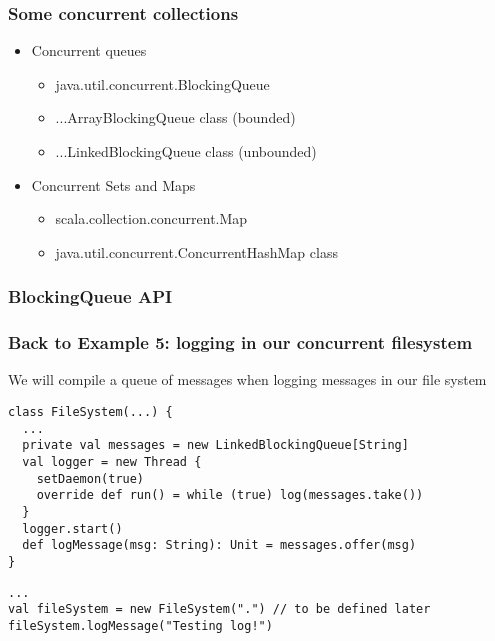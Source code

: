 \documentclass[aspectratio=169]{beamer}
\begin{document}
\begin{frame}[t]\frametitle{Some concurrent collections}
    
  \begin{itemize}
    \item Concurrent queues 
      \begin{itemize}
         \item java.util.concurrent.BlockingQueue 
        \item ...ArrayBlockingQueue \alert{class} (bounded)
        \item ...LinkedBlockingQueue \alert{class} (unbounded)
       \end{itemize} 
    \item Concurrent Sets and Maps
      \begin{itemize}
        \item scala.collection.concurrent.Map 
        \item java.util.concurrent.ConcurrentHashMap \alert{class}
      \end{itemize}
  \end{itemize}
\end{frame}

\begin{frame}[t]\frametitle{BlockingQueue API}
    \centering
\end{frame}

\begin{frame}[fragile]\frametitle{Back to Example 5: logging in our concurrent filesystem}
    
We will compile a queue of messages when \alert{logging} messages in our file system


\begin{lstlisting}[emph={execute,sleep,log,compareAndSet,logger,messages,logMessage}]
class FileSystem(...) {
  ...
  private val messages = new LinkedBlockingQueue[String]
  val logger = new Thread {
    setDaemon(true)
    override def run() = while (true) log(messages.take())
  }
  logger.start()
  def logMessage(msg: String): Unit = messages.offer(msg)
}
\end{lstlisting}

\begin{lstlisting}[emph={execute,sleep,log,compareAndSet,logMessage}]
...
val fileSystem = new FileSystem(".") // to be defined later
fileSystem.logMessage("Testing log!")
\end{lstlisting}
\end{frame}
\end{document}
